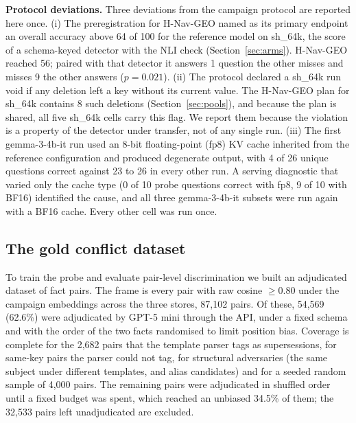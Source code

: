 \documentclass[11pt]{article}
\newcommand{\sub}[1]{\textsf{sh\_#1}}                    %
\newcommand{\geo}{H-Nav-GEO}
\begin{document}
\textbf{Protocol deviations.} Three deviations from the campaign protocol are reported here once. (i) The preregistration for \geo{} named as its primary endpoint an overall accuracy above 64 of 100 for the reference model on \sub{64k}, the score of a schema-keyed detector with the NLI check (Section~\ref{sec:arms}). \geo{} reached 56; paired with that detector it answers 1 question the other misses and misses 9 the other answers ($p=0.021$). (ii) The protocol declared a \sub{64k} run void if any deletion left a key without its current value. The \geo{} plan for \sub{64k} contains 8 such deletions (Section~\ref{sec:pools}), and because the plan is shared, all five \sub{64k} cells carry this flag. We report them because the violation is a property of the detector under transfer, not of any single run. (iii) The first gemma-3-4b-it run used an 8-bit floating-point (fp8) KV cache inherited from the reference configuration and produced degenerate output, with 4 of 26 unique questions correct against 23 to 26 in every other run. A serving diagnostic that varied only the cache type (0 of 10 probe questions correct with fp8, 9 of 10 with BF16) identified the cause, and all three gemma-3-4b-it subsets were run again with a BF16 cache. Every other cell was run once.

\subsection{The gold conflict dataset}
\label{sec:gold}

To train the probe and evaluate pair-level discrimination we built an adjudicated dataset of fact pairs. The frame is every pair with raw cosine $\ge0.80$ under the campaign embeddings across the three stores, 87,102 pairs. Of these, 54,569 (62.6\%) were adjudicated by GPT-5 mini through the API, under a fixed schema and with the order of the two facts randomised to limit position bias. %
Coverage is complete for the 2,682 pairs that the template parser tags as supersessions, for same-key pairs the parser could not tag, for structural adversaries (the same subject under different templates, and alias candidates) and for a seeded random sample of 4,000 pairs. The remaining pairs were adjudicated in shuffled order until a fixed budget was spent, which reached an unbiased 34.5\% of them; the 32,533 pairs left unadjudicated are excluded.
\end{document}
